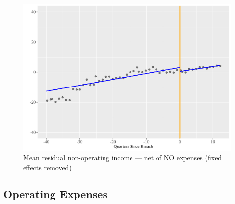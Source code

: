 \documentclass[../Main.tex]{subfiles}
\begin{document}
\FloatBarrier
\clearpage

\begin{figure}[!htbp]
    \centering
    \caption{Mean residual non-operating income --- net of NO expenses (fixed effects removed)}
    \label{nopfig}
    \includegraphics[width=\textwidth]{Images/mean_resid_nopiq_3y.png}
\end{figure}

\FloatBarrier
\clearpage

\subsection{Operating Expenses}
\end{document}
